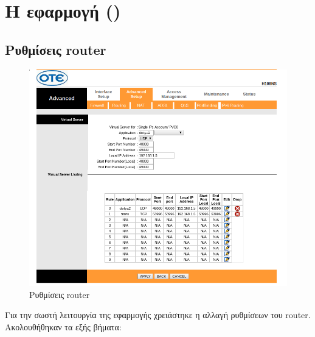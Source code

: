 \newcommand{\codeRef}[2][]{\hyperref[section:#2]{\texttt!#2#1!}}
\chapter{Η εφαρμογή (\appname{})}
\section{Ρυθμίσεις router}
\begin{figure}[htb]
\centering
\includegraphics[width=\linewidth]{images/router}
\caption{Ρυθμίσεις router}
\label{fig:router}
\end{figure}
Για την σωστή λειτουργία της εφαρμογής \appname{} χρειάστηκε η αλλαγή ρυθμίσεων του router.
Ακολουθήθηκαν τα εξής βήματα:
